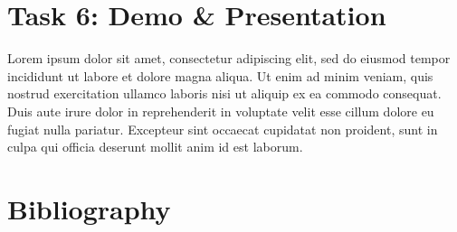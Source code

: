 \documentclass[titlepage]{article}
\begin{document}

\section*{Task 6: Demo \& Presentation}
Lorem ipsum dolor sit amet, consectetur adipiscing elit, sed do eiusmod tempor incididunt ut labore et dolore magna aliqua. Ut enim ad minim veniam, quis nostrud exercitation ullamco laboris nisi ut aliquip ex ea commodo consequat. Duis aute irure dolor in reprehenderit in voluptate velit esse cillum dolore eu fugiat nulla pariatur. Excepteur sint occaecat cupidatat non proident, sunt in culpa qui officia deserunt mollit anim id est laborum.

\section*{Bibliography}
\end{document}
